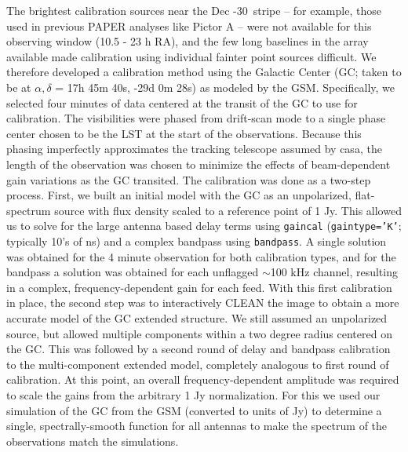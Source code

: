 \documentclass[twocolumn, trackchanges]{aastex61}
\newcommand{\casa}{{\sc casa}}
\begin{document}
The brightest calibration sources near the Dec -30\arcdeg\ stripe -- for
example, those used in previous PAPER analyses like Pictor A \citep{jacobs13b}
-- were not available for this observing window (10.5 - 23 h RA), and the few
long baselines in the array available made calibration using individual fainter
point sources difficult.  We therefore developed a calibration method using the
Galactic Center (GC; taken to be at $\alpha, \delta$ = 17h 45m 40s, -29d 0m 28s)
as modeled by the GSM. Specifically, we selected four minutes of data centered
at the transit of the GC to use for calibration.  The visibilities were phased
from drift-scan mode to a single phase center chosen to be the LST at the start
of the observations.  Because this phasing imperfectly approximates the tracking
telescope assumed by \casa, the length of the observation was chosen to minimize
the effects of beam-dependent gain variations as the GC transited.  The
calibration was done as a two-step process.  First, we built an initial model
with the GC as an unpolarized, flat-spectrum source with flux density scaled to
a reference point of 1 Jy.  This allowed us to solve for the large antenna based
delay terms using {\tt gaincal} ({\tt gaintype='K'}; typically 10's of ns) and a
complex bandpass using {\tt bandpass}.  A single solution was obtained for the 4
minute observation for both calibration types, and for the bandpass a solution
was obtained for each unflagged $\sim$100 kHz channel, resulting in a complex,
frequency-dependent gain for each feed. With this first calibration in place,
the second step was to interactively CLEAN the image to obtain a more accurate
model of the GC extended structure.  We still assumed an unpolarized source, but
allowed multiple components within a two degree radius centered on the GC.  This
was followed by a second round of delay and bandpass calibration to the
multi-component extended model, completely analogous to first round of
calibration.  At this point, an overall frequency-dependent amplitude was
required to scale the gains from the arbitrary 1 Jy normalization.  For this we
used our simulation of the GC from the GSM (converted to units of Jy) to
determine a single, spectrally-smooth function for all antennas to make the
spectrum of the observations match the simulations.
\end{document}
